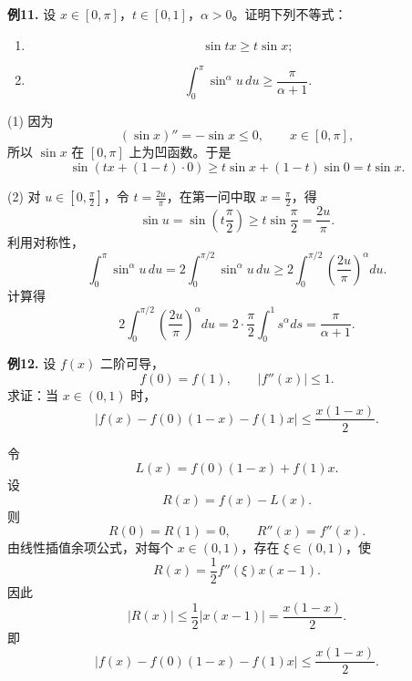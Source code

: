 \begin{problemblock}
\textbf{例11.} 设 \(x\in[0,\pi]\)，\(t\in[0,1]\)，\(\alpha>0\)。证明下列不等式：
\begin{enumerate}[label=(\arabic*), leftmargin=2.2em]
\item
\[
\sin tx\ge t\sin x;
\]
\item
\[
\int_0^\pi \sin^\alpha u\,du\ge\frac{\pi}{\alpha+1}.
\]
\end{enumerate}
\end{problemblock}
\begin{solutionblock}
(1) 因为
\[
(\sin x)''=-\sin x\le0,\qquad x\in[0,\pi],
\]
所以 \(\sin x\) 在 \([0,\pi]\) 上为凹函数。于是
\[
\sin(tx+(1-t)\cdot0)
\ge t\sin x+(1-t)\sin0=t\sin x.
\]

(2) 对 \(u\in[0,\frac\pi2]\)，令 \(t=\frac{2u}{\pi}\)，在第一问中取 \(x=\frac\pi2\)，得
\[
\sin u=\sin\left(t\frac\pi2\right)\ge t\sin\frac\pi2=\frac{2u}{\pi}.
\]
利用对称性，
\[
\int_0^\pi\sin^\alpha u\,du
=2\int_0^{\pi/2}\sin^\alpha u\,du
\ge
2\int_0^{\pi/2}\left(\frac{2u}{\pi}\right)^\alpha du.
\]
计算得
\[
2\int_0^{\pi/2}\left(\frac{2u}{\pi}\right)^\alpha du
=2\cdot\frac{\pi}{2}\int_0^1 s^\alpha ds
=\frac{\pi}{\alpha+1}.
\]
\end{solutionblock}

\begin{problemblock}
\textbf{例12.} 设 \(f(x)\) 二阶可导，
\[
f(0)=f(1),\qquad |f''(x)|\le1.
\]
求证：当 \(x\in(0,1)\) 时，
\[
\left|f(x)-f(0)(1-x)-f(1)x\right|
\le\frac{x(1-x)}2.
\]
\end{problemblock}
\begin{solutionblock}
令
\[
L(x)=f(0)(1-x)+f(1)x.
\]
设
\[
R(x)=f(x)-L(x).
\]
则
\[
R(0)=R(1)=0,\qquad R''(x)=f''(x).
\]
由线性插值余项公式，对每个 \(x\in(0,1)\)，存在 \(\xi\in(0,1)\)，使
\[
R(x)=\frac12 f''(\xi)x(x-1).
\]
因此
\[
|R(x)|
\le\frac12|x(x-1)|
=\frac{x(1-x)}2.
\]
即
\[
\left|f(x)-f(0)(1-x)-f(1)x\right|
\le\frac{x(1-x)}2.
\]
\end{solutionblock}

